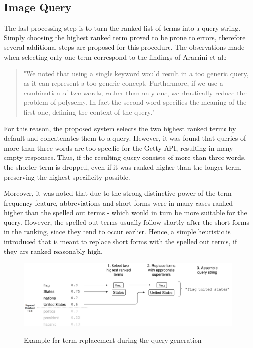 \documentclass[11pt,a4paper,twoside]{article}
\begin{document}
\subsection{Image Query} \label{SystemQuery}

The last processing step is to turn the ranked list of terms into a query string. Simply choosing the highest ranked term proved to be prone to errors, therefore several additional steps are proposed for this procedure. The observations made when selecting only one term correspond to the findings of Aramini et al.:

\begin{quote}
"We noted that using a single keyword would result in a too generic query, as it can represent a too generic concept. Furthermore, if we use a combination of two words, rather than only one, we drastically reduce the problem of polysemy. In fact the second word specifies the meaning of the first one, defining the context of the query." \cite[p. 142]{Aramini2015AutomaticImages}
\end{quote}

For this reason, the proposed system selects the two highest ranked terms by default and concatenates them to a query. However, it was found that queries of more than three words are too specific for the Getty API, resulting in many empty responses. Thus, if the resulting query consists of more than three words, the shorter term is dropped, even if it was ranked higher than the longer term, preserving the highest specificity possible.

Moreover, it was noted that due to the strong distinctive power of the term frequency feature, abbreviations and short forms were in many cases ranked higher than the spelled out terms - which would in turn be more suitable for the query. However, the spelled out terms usually follow shortly after the short forms in the ranking, since they tend to occur earlier. Hence, a simple heuristic is introduced that is meant to replace short forms with the spelled out terms, if they are ranked reasonably high.

\begin{figure}[h]
    \caption{Example for term replacement during the query generation}
    \centering
    \includegraphics[width=\columnwidth]{picpic-querygen.png}
    \label{fig:example-querygen}
\end{figure}
\end{document}
